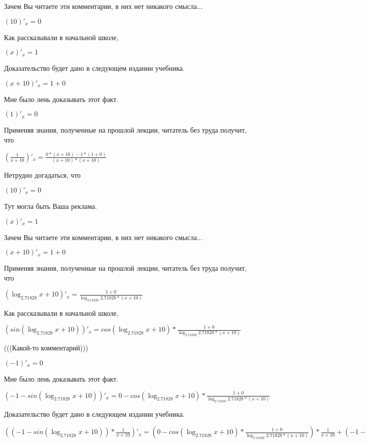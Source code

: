 \documentclass[12pt,a4paper,fleqn]{article}
\theoremstyle{definition}
\begin{document}
Зачем Вы читаете эти комментарии, в них нет никакого смысла... 

$( 10 )'_{x} =  0 $

Как рассказывали в начальной школе, 

$( x )'_{x} =  1 $

Доказательство будет дано в следующем издании учебника. 

$( x  +  10 )'_{x} =  1  +  0 $

Мне было лень доказывать этот факт.

$( 1 )'_{x} =  0 $

Применяя знания, полученные на прошлой лекции, читатель без труда получит, что 

$(\frac{ 1 }{ x  +  10 }
)'_{x} = \frac{ 0  * ( x  +  10 ) -  1  * ( 1  +  0 )}{( x  +  10 ) * ( x  +  10 )}
$

Нетрудно догадаться, что 

$( 10 )'_{x} =  0 $

Тут могла быть Ваша реклама. 

$( x )'_{x} =  1 $

Зачем Вы читаете эти комментарии, в них нет никакого смысла... 

$( x  +  10 )'_{x} =  1  +  0 $

Применяя знания, полученные на прошлой лекции, читатель без труда получит, что 

$(\log_{ 2.71828 }{ x  +  10 })'_{x} = \frac{ 1  +  0 }{\log_{ 2.71828 }{ 2.71828 } * ( x  +  10 )}
$

Как рассказывали в начальной школе, 

$(sin(\log_{ 2.71828 }{ x  +  10 }))'_{x} = cos(\log_{ 2.71828 }{ x  +  10 }) * \frac{ 1  +  0 }{\log_{ 2.71828 }{ 2.71828 } * ( x  +  10 )}
$

(((Какой-то комментарий))) 

$( -1 )'_{x} =  0 $

Мне было лень доказывать этот факт.

$( -1  - sin(\log_{ 2.71828 }{ x  +  10 }))'_{x} =  0  - cos(\log_{ 2.71828 }{ x  +  10 }) * \frac{ 1  +  0 }{\log_{ 2.71828 }{ 2.71828 } * ( x  +  10 )}
$

Доказательство будет дано в следующем издании учебника. 

$(( -1  - sin(\log_{ 2.71828 }{ x  +  10 })) * \frac{ 1 }{ x  +  10 }
)'_{x} = ( 0  - cos(\log_{ 2.71828 }{ x  +  10 }) * \frac{ 1  +  0 }{\log_{ 2.71828 }{ 2.71828 } * ( x  +  10 )}
) * \frac{ 1 }{ x  +  10 }
 + ( -1  - sin(\log_{ 2.71828 }{ x  +  10 })) * \frac{ 0  * ( x  +  10 ) -  1  * ( 1  +  0 )}{( x  +  10 ) * ( x  +  10 )}
$
\end{document}
